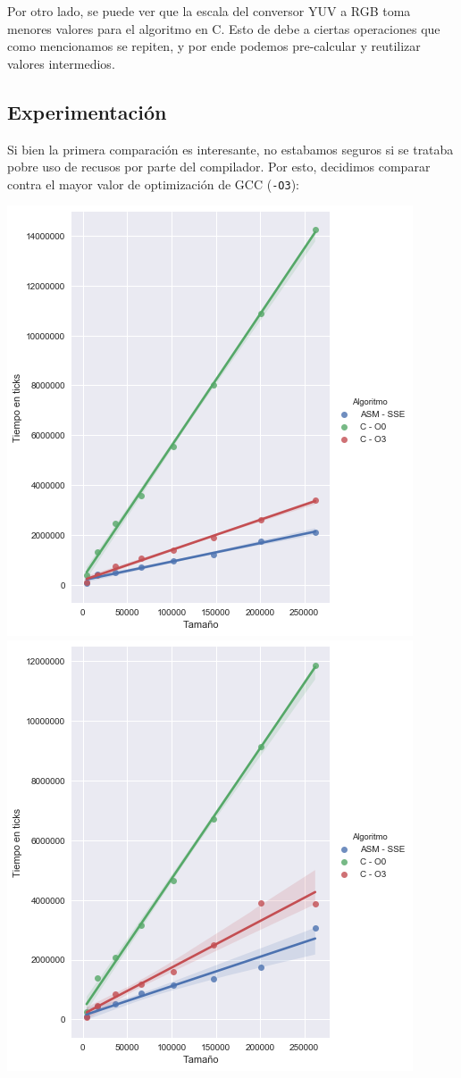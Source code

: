 Por otro lado, se puede ver que la escala del conversor YUV a RGB toma menores valores para el algoritmo en C. Esto de debe a ciertas operaciones que como mencionamos se repiten, y por ende podemos pre-calcular y reutilizar valores intermedios.


\subsection{Experimentación}

Si bien la primera comparación es interesante, no estabamos seguros si se trataba pobre uso de recusos por parte del compilador. Por esto, decidimos comparar contra el mayor valor de optimización de GCC (\texttt{-O3}):

\begin{center} 
\includegraphics[scale=0.5]{img/rgb2yuv_CvsASMvsO3.png}
\includegraphics[scale=0.5]{img/yuv2rgb_CvsASMvsO3.png}
\end{center}

